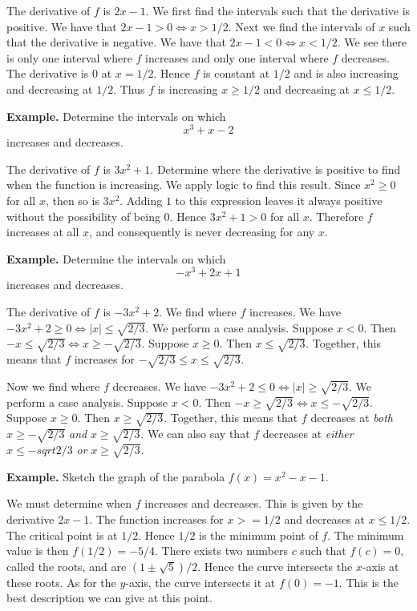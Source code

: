 The derivative of $f$ is $2x - 1$. We first find the intervals such that the derivative is positive. We have that $2x - 1 > 0 \Leftrightarrow x > 1/2$. Next we find the intervals of $x$ such that the derivative is negative. We have that $2x - 1 < 0 \Leftrightarrow x < 1/2$. We see there is only one interval where $f$ increases and only one interval where $f$ decreases. The derivative is $0$ at $x = 1/2$. Hence $f$ is constant at $1/2$ and is also increasing and decreasing at $1/2$. Thus $f$ is increasing $x \ge 1/2$ and decreasing at $x \le 1/2$.

\textbf{Example.} Determine the intervals on which
\[x^3 + x - 2\]
increases and decreases.

The derivative of $f$ is $3x^2 + 1$. Determine where the derivative is positive to find when the function is increasing. We apply logic to find this result. Since $x^2 \ge 0$ for all $x$, then so is $3x^2$. Adding $1$ to this expression leaves it always positive without the possibility of being $0$. Hence $3x^2 + 1 > 0$ for all $x$. Therefore $f$ increases at all $x$, and consequently is never decreasing for any $x$.

\textbf{Example.} Determine the intervals on which
\[-x^3 + 2x + 1\]
increases and decreases.

The derivative of $f$ is $-3x^2 + 2$. We find where $f$ increases. We have $-3x^2 + 2 \ge 0 \Leftrightarrow |x| \le \sqrt{2/3}$. We perform a case analysis. Suppose $x < 0$. Then $-x \le \sqrt{2/3} \Leftrightarrow x \ge -\sqrt{2/3}$. Suppose $x \ge 0$. Then $x \le \sqrt{2/3}$. Together, this means that $f$ increases for $-\sqrt{2/3} \le x \le \sqrt{2/3}$.

Now we find where $f$ decreases. We have $-3x^2 + 2 \le 0 \Leftrightarrow |x| \ge \sqrt{2/3}$. We perform a case analysis. Suppose $x < 0$. Then $-x \ge \sqrt{2/3} \Leftrightarrow x \le -\sqrt{2/3}$. Suppose $x \ge 0$. Then $x \ge \sqrt{2/3}$. Together, this means that $f$ decreases at \textit{both} $x \ge -\sqrt{2/3}$ \textit{and} $x \ge \sqrt{2/3}$. We can also say that $f$ decreases at \textit{either} $x \le -sqrt{2/3}$ \textit{or} $x \ge \sqrt{2/3}$.

\textbf{Example.} Sketch the graph of the parabola $f(x) = x^2 - x - 1$.

We must determine when $f$ increases and decreases. This is given by the derivative $2x - 1$. The function increases for $x >= 1/2$ and decreases at $x \le 1/2$. The critical point is at $1/2$. Hence $1/2$ is the minimum point of $f$. The minimum value is then $f(1/2) = -5/4$. There exists two numbers $c$ such that $f(c) = 0$, called the roots, and are $(1 \pm \sqrt{5})/2$. Hence the curve intersects the $x$-axis at these roots. As for the $y$-axis, the curve intersects it at $f(0) = -1$. This is the best description we can give at this point.


